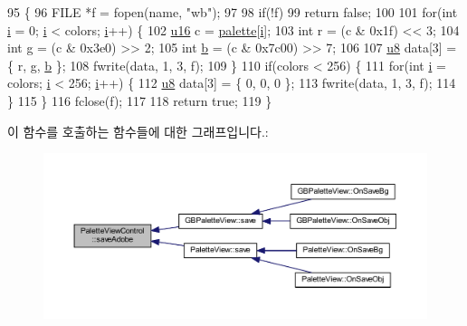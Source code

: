 \begin{DoxyCode}
95 \{
96   FILE *f = fopen(name, \textcolor{stringliteral}{"wb"});
97 
98   \textcolor{keywordflow}{if}(!f)
99     \textcolor{keywordflow}{return} \textcolor{keyword}{false};
100 
101   \textcolor{keywordflow}{for}(\textcolor{keywordtype}{int} \mbox{\hyperlink{expr-lex_8cpp_acb559820d9ca11295b4500f179ef6392}{i}} = 0; \mbox{\hyperlink{expr-lex_8cpp_acb559820d9ca11295b4500f179ef6392}{i}} < colors; \mbox{\hyperlink{expr-lex_8cpp_acb559820d9ca11295b4500f179ef6392}{i}}++) \{
102     \mbox{\hyperlink{_system_8h_a9e6c91d77e24643b888dbd1a1a590054}{u16}} c = \mbox{\hyperlink{class_palette_view_control_a1a5ce1812cf6c8d26889f4eb03d1d4ec}{palette}}[\mbox{\hyperlink{expr-lex_8cpp_acb559820d9ca11295b4500f179ef6392}{i}}];
103     \textcolor{keywordtype}{int} r = (c & 0x1f) << 3;
104     \textcolor{keywordtype}{int} g = (c & 0x3e0) >> 2;
105     \textcolor{keywordtype}{int} \mbox{\hyperlink{expr-lex_8cpp_a91b64995742fd30063314f12340b4b5a}{b}} = (c & 0x7c00) >> 7;
106 
107     \mbox{\hyperlink{_system_8h_aed742c436da53c1080638ce6ef7d13de}{u8}} data[3] = \{ r, g, \mbox{\hyperlink{expr-lex_8cpp_a91b64995742fd30063314f12340b4b5a}{b}} \};
108     fwrite(data, 1, 3, f);
109   \}
110   \textcolor{keywordflow}{if}(colors < 256) \{
111     \textcolor{keywordflow}{for}(\textcolor{keywordtype}{int} \mbox{\hyperlink{expr-lex_8cpp_acb559820d9ca11295b4500f179ef6392}{i}} = colors; \mbox{\hyperlink{expr-lex_8cpp_acb559820d9ca11295b4500f179ef6392}{i}} < 256; \mbox{\hyperlink{expr-lex_8cpp_acb559820d9ca11295b4500f179ef6392}{i}}++) \{
112       \mbox{\hyperlink{_system_8h_aed742c436da53c1080638ce6ef7d13de}{u8}} data[3] = \{ 0, 0, 0 \};
113       fwrite(data, 1, 3, f);
114     \}
115   \}
116   fclose(f);
117 
118   \textcolor{keywordflow}{return} \textcolor{keyword}{true};
119 \}
\end{DoxyCode}
이 함수를 호출하는 함수들에 대한 그래프입니다.\+:
\nopagebreak
\begin{figure}[H]
\begin{center}
\leavevmode
\includegraphics[width=350pt]{class_palette_view_control_a14d553a87d89463719adcaa63f42a72b_icgraph}
\end{center}
\end{figure}
\mbox{\label{class_palette_view_control_a9efcff77eaf476013ac5f3ebd2d53779}} 
